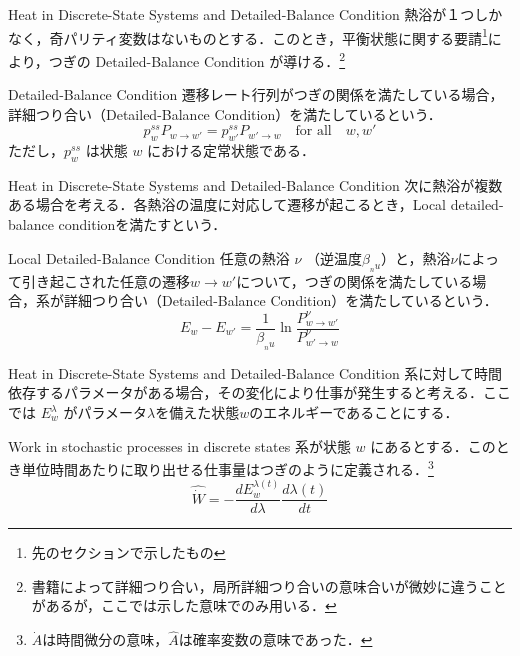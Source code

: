 \documentclass[aspectratio=169, dvipdfmx, 11pt,uplatex]{beamer} %
\begin{document}
\begin{frame}{Heat in Discrete-State Systems and Detailed-Balance Condition}
  熱浴が１つしかなく，奇パリティ変数はないものとする．このとき，平衡状態に関する要請\footnote{先のセクションで示したもの}により，つぎの Detailed-Balance Condition が導ける．\footnote{書籍によって詳細つり合い，局所詳細つり合いの意味合いが微妙に違うことがあるが，ここでは示した意味でのみ用いる．}
  \begin{block}{Detailed-Balance Condition}
    遷移レート行列がつぎの関係を満たしている場合，詳細つり合い（Detailed-Balance Condition）を満たしているという．
    \begin{equation}
      p_w^{ss} P_{w \to w'} = p_{w'}^{ss} P_{w' \to w} \quad \text{for all} \quad w, w'
    \end{equation}
    ただし，$p_w^{ss}$ は状態 $w$ における定常状態である．
  \end{block}
\end{frame}

\begin{frame}{Heat in Discrete-State Systems and Detailed-Balance Condition}
  次に熱浴が複数ある場合を考える．各熱浴の温度に対応して遷移が起こるとき，Local detailed-balance conditionを満たすという．
  \begin{block}{Local Detailed-Balance Condition}
    任意の熱浴 $\nu $ （逆温度$\beta_{_nu}$）と，熱浴$\nu $によって引き起こされた任意の遷移$w \to w'$について，つぎの関係を満たしている場合，系が詳細つり合い（Detailed-Balance Condition）を満たしているという．
    \begin{equation}
      E_w - E_{w'} = \frac{1}{\beta_{_nu }} \ln \frac{P_{w \to w'}^{\nu }}{P_{w' \to w}^{\nu }}
    \end{equation}
  \end{block}
\end{frame}

\begin{frame}{Heat in Discrete-State Systems and Detailed-Balance Condition}
  系に対して時間依存するパラメータがある場合，その変化により仕事が発生すると考える．ここでは $E_w^{\lambda }$ がパラメータ$\lambda $を備えた状態$w$のエネルギーであることにする．
  \begin{block}{Work in stochastic processes in discrete states}
    系が状態 $w$ にあるとする．このとき単位時間あたりに取り出せる仕事量はつぎのように定義される．\footnote{$\dot{A}$は時間微分の意味，$\hat{A}$は確率変数の意味であった．}
    \begin{equation}
      \hat{\dot{W}} = - \frac{d E_w^{\lambda(t)}}{d \lambda} \frac{d \lambda(t)}{dt}
    \end{equation}
  \end{block}
\end{frame}
\end{document}
